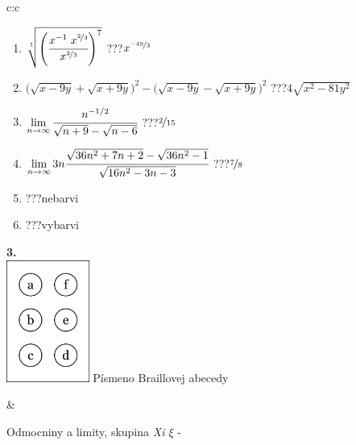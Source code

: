 \documentclass[10pt]{report}
\begin{document}
\begin{tabular}{c:c}
\begin{minipage}[c][104.5mm][t]{0.5\linewidth}
\begin{center}
\begin{minipage}{0.79\linewidth}
\begin{center}
\begin{varwidth}{\linewidth}
\begin{enumerate}
\small
\item $\sqrt[1]{\left(\cfrac{x^{-1}\;x^{\nicefrac{2}{3}}}{x^{\nicefrac{2}{3}}}\right)^{7}}$\quad \dotfill\; ???\;\dotfill \quad $x^{\nicefrac{-49}{3}}$
\item {\footnotesize{\scriptsize$\big(\sqrt{x-9y}+\sqrt{x+9y}\big)^2-\big(\sqrt{x-9y}-\sqrt{x+9y}\big)^2$}\quad \dotfill\; ???\;\dotfill \quad $4\sqrt{x^2-81y^2}$}
\item $\lim\limits_{n\to\infty}\cfrac{n^{-1/2}}{\sqrt{n+9}-\sqrt{n-6}}$\quad \dotfill\; ???\;\dotfill \quad $\nicefrac{2}{15}$
\item $\lim\limits_{n\to\infty}3n\cfrac{\sqrt{36n^2+7n+2}-\sqrt{36n^2-1}}{\sqrt{16n^2-3n-3}}$\quad \dotfill\; ???\;\dotfill \quad $\nicefrac{7}{8}$
\item \quad \dotfill\; ???\;\dotfill \quad nebarvi
\item \quad \dotfill\; ???\;\dotfill \quad vybarvi
\end{enumerate}
\end{varwidth}
\end{center}
\end{minipage}
\begin{minipage}{0.20\linewidth}
\begin{center}
{\Huge\bfseries 3.} \\[2mm]
\includegraphics[height=40mm]{../images/braille.png}
{\small Písmeno Braillovej abecedy}
\end{center}
\end{minipage}
\end{center}
\end{minipage}
&
\begin{minipage}[c][104.5mm][t]{0.5\linewidth}
\begin{center}
\vspace{7mm}
{\huge Odmocniny a limity, skupina \textit{Xi $\xi$} -}\\[5mm]

\end{center}
\end{minipage}
\end{tabular}
\end{document}
